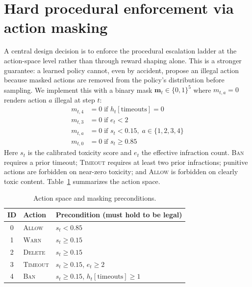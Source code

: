 \documentclass{article}
\begin{document}
\section{Hard procedural enforcement via action masking}
\label{sec:masking}

A central design decision is to enforce the procedural escalation ladder at the
action-space level rather than through reward shaping alone. This is a stronger
guarantee: a learned policy cannot, even by accident, propose an illegal action
because masked actions are removed from the policy's distribution before
sampling. We implement this with a binary mask $\mathbf{m}_t \in \{0,1\}^5$ where
$m_{t,a} = 0$ renders action $a$ illegal at step $t$:
\begin{align}
  m_{t,4} &= 0 \;\text{if } h_t[\text{timeouts}] = 0 \label{eq:mask_ban}\\
  m_{t,3} &= 0 \;\text{if } e_t < 2 \label{eq:mask_timeout}\\
  m_{t,a} &= 0 \;\text{if } s_t < 0.15,\; a \in \{1,2,3,4\} \label{eq:mask_low_tox}\\
  m_{t,0} &= 0 \;\text{if } s_t \geq 0.85 \label{eq:mask_high_tox}
\end{align}
Here $s_t$ is the calibrated toxicity score and $e_t$ the effective infraction
count. \textsc{Ban} requires a prior timeout; \textsc{Timeout} requires at least
two prior infractions; punitive actions are forbidden on near-zero toxicity; and
\textsc{Allow} is forbidden on clearly toxic content. Table~\ref{tab:actions}
summarizes the action space.

\begin{table}[t]
  \caption{Action space and masking preconditions.}
  \label{tab:actions}
  \centering
  \begin{tabular}{cll}
    \toprule
    ID & Action & Precondition (must hold to be legal) \\
    \midrule
    0 & \textsc{Allow}   & $s_t < 0.85$ \\
    1 & \textsc{Warn}    & $s_t \geq 0.15$ \\
    2 & \textsc{Delete}  & $s_t \geq 0.15$ \\
    3 & \textsc{Timeout} & $s_t \geq 0.15$,\; $e_t \geq 2$ \\
    4 & \textsc{Ban}     & $s_t \geq 0.15$,\; $h_t[\text{timeouts}] \geq 1$ \\
    \bottomrule
  \end{tabular}
\end{table}
\end{document}
